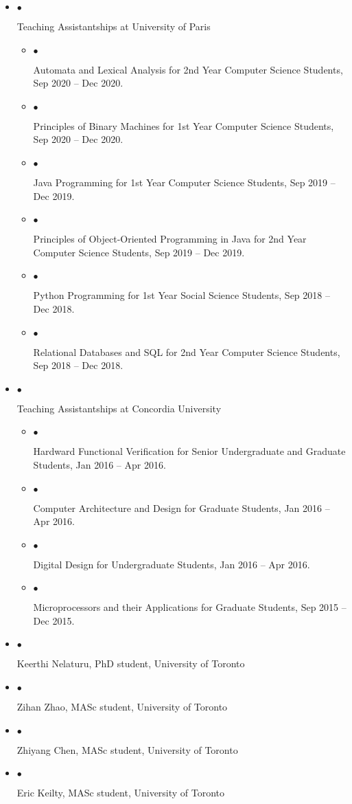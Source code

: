 \documentclass[10pt]{article}
\newcommand{\lbar}[1]{{\color{#1}\ding{118}}\hspace*{2pt}}
\newcommand{\service}[1]{\item $\bullet$ \hspace{1ex}\parbox{7.2in}{#1}}
\newenvironment{itemregion}[1]{
  \vspace*{0.5ex}
  {\scalebox{1.4}{\textbf{#1}}}
  \begin{itemize}\itemsep1pt}
  {\end{itemize}\vspace{0.8ex}}
\begin{document}
\begin{itemregion}{\lbar{red}Teaching}
  \service{Teaching Assistantships at University of Paris}
  \begin{itemize}
    \service{Automata and Lexical Analysis for 2nd Year Computer Science Students, Sep 2020 -- Dec 2020.}
    \service{Principles of Binary Machines for 1st Year Computer Science Students, Sep 2020 -- Dec 2020.}
    \service{Java Programming for 1st Year Computer Science Students, Sep 2019 -- Dec 2019.}
    \service{Principles of Object-Oriented Programming in Java for 2nd Year Computer Science Students, Sep 2019 -- Dec 2019.}
    \service{Python Programming for 1st Year Social Science Students, Sep 2018 -- Dec 2018.}
    \service{Relational Databases and SQL for 2nd Year Computer Science Students, Sep 2018 -- Dec 2018.}
  \end{itemize}
  \service{Teaching Assistantships at Concordia University}
  \begin{itemize}
    \service{Hardward Functional Verification for Senior Undergraduate and Graduate Students, Jan 2016 -- Apr 2016.}
    \service{Computer Architecture and Design for Graduate Students, Jan 2016 -- Apr 2016.}
    \service{Digital Design for Undergraduate Students, Jan 2016 -- Apr 2016.}
    \service{Microprocessors and their Applications for Graduate Students, Sep 2015 -- Dec 2015.}
  \end{itemize}
\end{itemregion} 

\begin{itemregion}{\lbar{red}Mentoring}
  \service{Keerthi Nelaturu, PhD student, University of Toronto}
  \service{Zihan Zhao, MASc student, University of Toronto}
  \service{Zhiyang Chen, MASc student, University of Toronto}
  \service{Eric Keilty, MASc student, University of Toronto}
\end{itemregion} 
\end{document}
